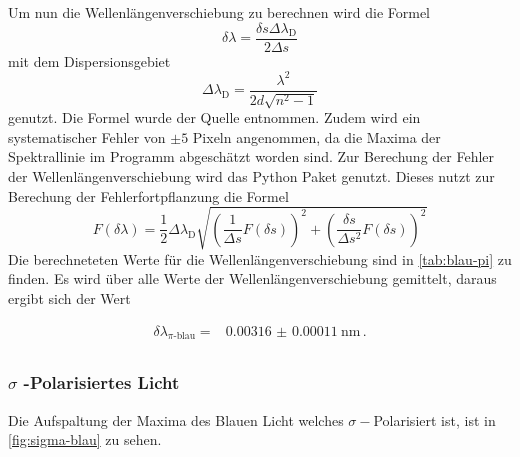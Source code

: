 Um nun die Wellenlängenverschiebung zu berechnen wird die Formel
\begin{equation}
    \delta \lambda = \frac{\delta s \Delta \lambda _\text{D}}{2\Delta s}
   \label{eq:Wellenlaengenverschiebung}
\end{equation}
mit dem Dispersionsgebiet
\begin{equation*}
    \Delta \lambda _\text{D} = \frac{\lambda^2}{2d\sqrt{n^2-1}}
\end{equation*}
genutzt. 
\FloatBarrier
Die Formel wurde der Quelle \cite[4]{anleitung} entnommen.
Zudem wird ein systematischer Fehler von $\pm 5$ Pixeln angenommen, da die Maxima der Spektrallinie im Programm \cite{paint3d} abgeschätzt worden sind.
Zur Berechung der Fehler der Wellenlängenverschiebung wird das Python Paket \cite{uncertainties} genutzt.
Dieses nutzt zur Berechung der Fehlerfortpflanzung die Formel
\begin{equation}
    F(\delta \lambda) = \frac{1}{2} \Delta \lambda _\text{D} \sqrt{\left (\frac{1}{\Delta s} F(\delta s) \right)^2 + \left ( \frac{\delta s}{\Delta s^2} F(\delta s) \right )^2}
    \label{eq:fehler_Wellenlaengenverschiebung}
\end{equation}
Die berechneteten Werte für die Wellenlängenverschiebung sind in \autoref{tab:blau-pi} zu finden.
Es wird über alle Werte der Wellenlängenverschiebung gemittelt, daraus ergibt sich der Wert

\begin{align*}
    \delta \lambda _\text{$\pi$-blau} = & \SI{0.00316(011)}{\nano\meter} \, . \\
\end{align*}

\subsubsection{\boldmath\texorpdfstring{$\sigma$}{sigma} -Polarisiertes Licht}

Die Aufspaltung der Maxima des Blauen Licht welches $\sigma -$Polarisiert ist, ist in \autoref{fig:sigma-blau} zu sehen.

